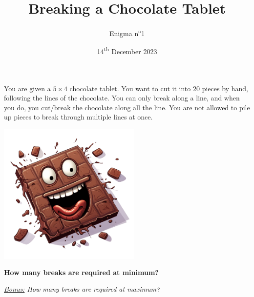 \documentclass[a4paper, top=10mm]{article}
\title{\textbf{\huge{Breaking a Chocolate Tablet}}}
\author{Enigma n\textsuperscript{o}1}
\date{14\textsuperscript{th} December 2023}
\begin{document}
	\maketitle
	
	You are given a $5 \times 4$ chocolate tablet.
	You want to cut it into $20$ pieces by hand, following the lines of the chocolate.
	You can only break along a line, and when you do, you cut/break the chocolate along all the line.
	You are not allowed to pile up pieces to break through multiple lines at once.
	
	\begin{center}
		\includegraphics[height=200pt]{01chocolate_cartoon.png}
	\end{center}
	
	\textbf{How many breaks are required at minimum?}
	
	\vspace{2cm}
	
	\textit{\underline{Bonus:} How many breaks are required at maximum?}
	
	
\end{document}
